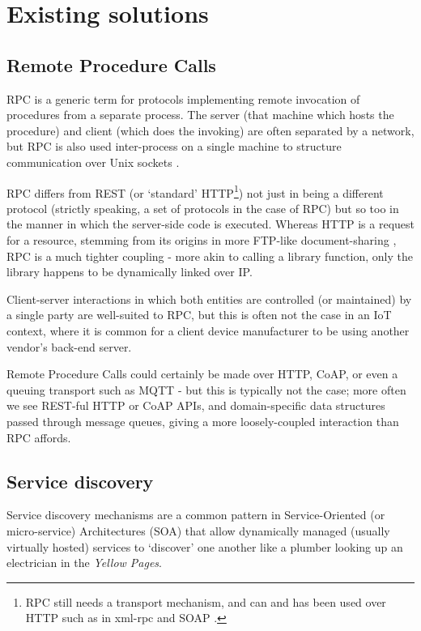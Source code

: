 \section{Existing solutions}\label{soln}
\subsection{Remote Procedure Calls}\label{soln:rpc}
RPC is a generic term for protocols implementing remote invocation of procedures from a separate process. The server (that machine which hosts the procedure) and client (which does the invoking) are often separated by a network, but RPC is also used inter-process on a single machine to structure communication over Unix sockets \cite{rpc_unix_sockets}.

RPC differs from REST (or `standard' HTTP\footnote{RPC still needs a transport mechanism, and can and has been used over HTTP such as in xml-rpc \cite{xml-rpc} and SOAP \cite{ietf-soap-draft}.}) not just in being a different protocol (strictly speaking, a set of protocols in the case of RPC) but so too in the manner in which the server-side code is executed. Whereas HTTP is a request for a resource, stemming from its origins in more FTP-like document-sharing \cite{http_history, http_vs_ftp}, RPC is a much tighter coupling - more akin to calling a library function, only the library happens to be dynamically linked over IP.

Client-server interactions in which both entities are controlled (or maintained) by a single party are well-suited to RPC, but this is often not the case in an IoT context, where it is common for a client device manufacturer to be using another vendor's back-end server.

Remote Procedure Calls could certainly be made over HTTP, CoAP, or even a queuing transport such as MQTT \cite{mqtt-rpc} - but this is typically not the case; more often we see REST-ful HTTP or CoAP APIs, and domain-specific data structures passed through message queues, giving a more loosely-coupled interaction than RPC affords.

\subsection{Service discovery}\label{soln:service-discovery}
Service discovery mechanisms are a common pattern in Service-Oriented (or micro-service) Architectures (SOA) that allow dynamically managed (usually virtually hosted) services to `discover' one another like a plumber looking up an electrician in the \emph{Yellow Pages}. 

